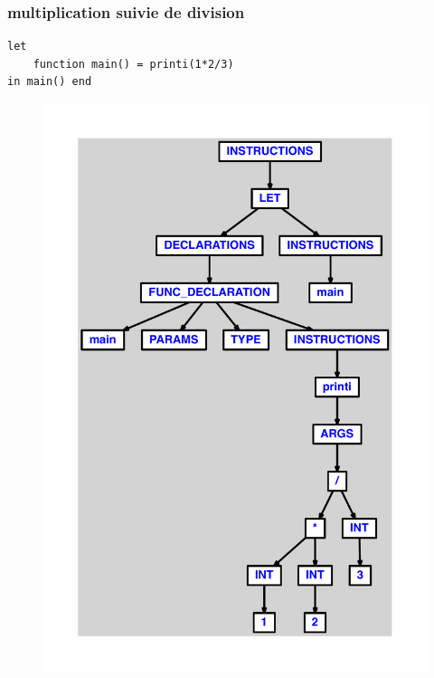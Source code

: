 \documentclass{article}
\begin{document}
\subsubsection{multiplication suivie de division}
\begin{lstlisting}
let
	function main() = printi(1*2/3)
in main() end
\end{lstlisting}
\newpage
\begin{figure}[H]
\centering
\includegraphics[max width=\textwidth]{ast/ast_50.pdf}
\end{figure}
\newpage
\end{document}
